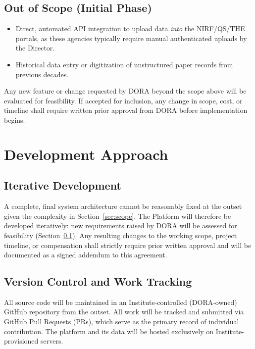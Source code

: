\documentclass[11pt]{article}
\begin{document}
\subsection{Out of Scope (Initial Phase)}
\label{sec:oos}
\begin{itemize}[leftmargin=1.4em, itemsep=3pt]
\item Direct, automated API integration to upload data \textit{into} the NIRF/QS/THE portals, as these agencies typically require manual authenticated uploads by the Director.
\item Historical data entry or digitization of unstructured paper records from previous decades.
\end{itemize}

Any new feature or change requested by DORA beyond the scope above will be evaluated for feasibility. If accepted for inclusion, any change in scope, cost, or timeline shall require written prior approval from DORA before implementation begins.

\section{Development Approach}

\subsection{Iterative Development}
\label{sec:iterative}
A complete, final system architecture cannot be reasonably fixed at the outset given the complexity in Section~\ref{sec:scope}. The Platform will therefore be developed iteratively: new requirements raised by DORA will be assessed for feasibility (Section~\ref{sec:oos}). Any resulting changes to the working scope, project timeline, or compensation shall strictly require prior written approval and will be documented as a signed addendum to this agreement.

\subsection{Version Control and Work Tracking}
All source code will be maintained in an Institute-controlled (DORA-owned) GitHub repository from the outset. All work will be tracked and submitted via GitHub Pull Requests (PRs), which serve as the primary record of individual contribution. The platform and its data will be hosted exclusively on Institute-provisioned servers.
\end{document}
